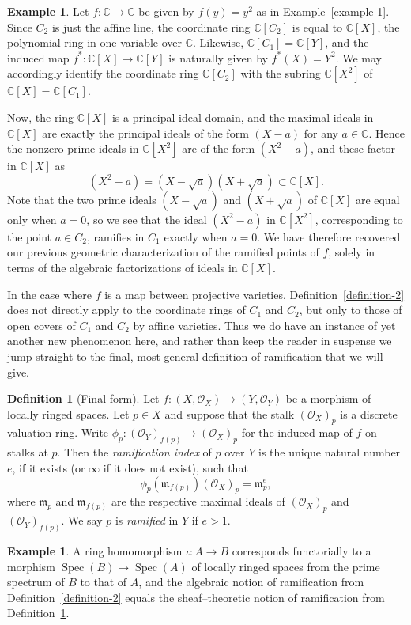 \documentclass[12pt]{article}
\newcommand{\m}{{\mathfrak{m}}}
\newcommand{\C}{\mathbb{C}}
\renewcommand{\O}{\mathcal{O}}
\newcommand{\lra}{\longrightarrow}
\newcommand{\Spec}{\operatorname{Spec}}
\theoremstyle{definition}
\newtheorem{definition}[theorem]{Definition}
\newtheorem{example}[theorem]{Example}
\begin{document}
\begin{example}
Let $f: \C \lra \C$ be given by $f(y) = y^2$ as in
Example~\ref{example-1}. Since $C_2$ is just the affine line, the
coordinate ring $\C[C_2]$ is equal to $\C[X]$, the polynomial ring in
one variable over $\C$. Likewise, $\C[C_1] = \C[Y]$, and the induced
map $f^*: \C[X] \lra \C[Y]$ is naturally given by $f^*(X) = Y^2$. We
may accordingly identify the coordinate ring $\C[C_2]$ with the
subring $\C[X^2]$ of $\C[X] = \C[C_1]$.

Now, the ring $\C[X]$ is a principal ideal domain, and the maximal
ideals in $\C[X]$ are exactly the principal ideals of the form $(X -
a)$ for any $a \in \C$. Hence the nonzero prime ideals in $\C[X^2]$
are of the form $(X^2 - a)$, and these factor in $\C[X]$ as
$$
(X^2 - a) = (X - \sqrt{a}) (X + \sqrt{a}) \subset \C[X].
$$
Note that the two prime ideals $(X - \sqrt{a})$ and $(X + \sqrt{a})$
of $\C[X]$ are equal only when $a = 0$, so we see that the ideal $(X^2
- a)$ in $\C[X^2]$, corresponding to the point $a \in C_2$, ramifies
in $C_1$ exactly when $a = 0$. We have therefore recovered our
previous geometric characterization of the ramified points of $f$,
solely in terms of the algebraic factorizations of ideals in $\C[X]$.
\end{example}

In the case where $f$ is a map between projective varieties,
Definition~\ref{definition-2} does not directly apply to the
coordinate rings of $C_1$ and $C_2$, but only to those of open covers
of $C_1$ and $C_2$ by affine varieties. Thus we do have an instance of
yet another new phenomenon here, and rather than keep the reader in
suspense we jump straight to the final, most general definition of
ramification that we will give.

\begin{definition}[Final form]\label{final}
Let $f: (X,\O_X) \lra (Y,\O_Y)$ be a morphism of locally ringed
spaces. Let $p \in X$ and suppose that the stalk $(\O_X)_p$ is a
discrete valuation ring. Write $\phi_p: (\O_Y)_{f(p)} \lra (\O_X)_p$
for the induced map of $f$ on stalks at $p$. Then the {\em
ramification index} of $p$ over $Y$ is the unique natural number $e$,
if it exists (or $\infty$ if it does not exist), such that
$$
\phi_p(\m_{f(p)})(\O_X)_p = \m_p^e,
$$
where $\m_p$ and $\m_{f(p)}$ are the respective maximal ideals of
$(\O_X)_p$ and $(\O_Y)_{f(p)}$. We say $p$ is {\em ramified} in $Y$ if
$e > 1$.
\end{definition}

\begin{example}
A ring homomorphism $\iota: A \lra B$ corresponds functorially to a
morphism $\Spec(B) \lra \Spec(A)$ of locally ringed spaces from the
prime spectrum of $B$ to that of $A$, and the algebraic notion of
ramification from Definition~\ref{definition-2} equals the
sheaf--theoretic notion of ramification from Definition~\ref{final}.
\end{example}
\end{document}
